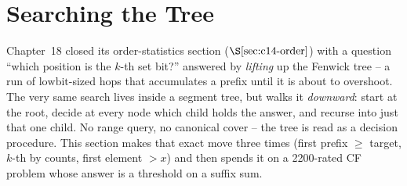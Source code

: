 \section{Searching the Tree}\label{sec:c13-search}

\begin{previouslybox}
Chapter~18 closed its order-statistics section (\(\secref{c14-order}\)) with a
question ``which position is the \(k\)-th set bit?'' answered by \emph{lifting}
up the Fenwick tree -- a run of \(\text{lowbit}\)-sized hops that accumulates a
prefix until it is about to overshoot.  The very same search lives inside a
segment tree, but walks it \emph{downward}: start at the root, decide at every
node which child holds the answer, and recurse into just that one child.  No
range query, no canonical cover -- the tree is read as a decision procedure.
This section makes that exact move three times (first prefix \(\ge\) target,
\(k\)-th by counts, first element \(>x\)) and then spends it on a 2200-rated
CF problem whose answer is a threshold on a suffix sum.
\end{previouslybox}

